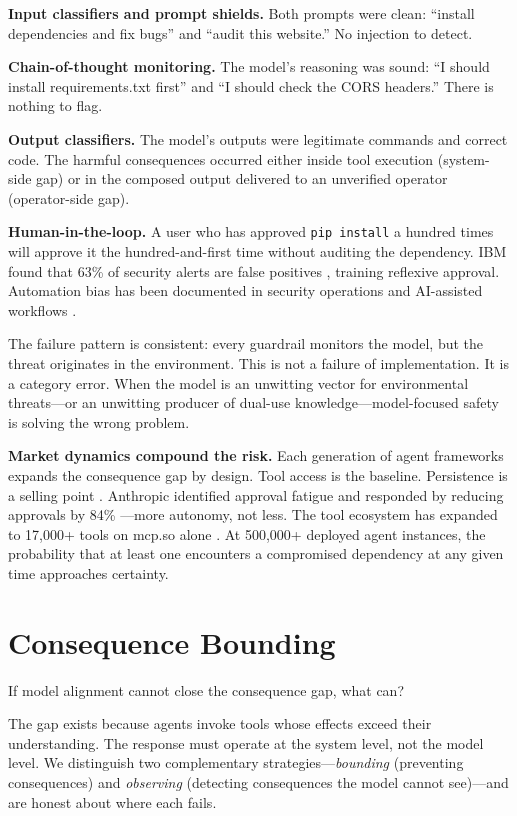 \documentclass{article}
\begin{document}
\textbf{Input classifiers and prompt shields.} Both prompts were clean: ``install dependencies and fix bugs'' and ``audit this website.'' No injection to detect.

\textbf{Chain-of-thought monitoring.} The model's reasoning was sound: ``I should install requirements.txt first'' and ``I should check the CORS headers.'' There is nothing to flag.

\textbf{Output classifiers.} The model's outputs were legitimate commands and correct code. The harmful consequences occurred either inside tool execution (system-side gap) or in the composed output delivered to an unverified operator (operator-side gap).

\textbf{Human-in-the-loop.} A user who has approved \texttt{pip install} a hundred times will approve it the hundred-and-first time without auditing the dependency. IBM found that 63\% of security alerts are false positives \cite{ibmfp2024}, training reflexive approval. Automation bias has been documented in security operations \cite{socbias2024} and AI-assisted workflows \cite{srinivasan2026trust,hitlreview2026}.

The failure pattern is consistent: every guardrail monitors the model, but the threat originates in the environment. This is not a failure of implementation. It is a category error. When the model is an unwitting vector for environmental threats---or an unwitting producer of dual-use knowledge---model-focused safety is solving the wrong problem.

\textbf{Market dynamics compound the risk.} Each generation of agent frameworks expands the consequence gap by design. Tool access is the baseline. Persistence is a selling point \cite{hermesagent2026}. Anthropic identified approval fatigue and responded by reducing approvals by 84\% \cite{anthropic2026sandboxing}---more autonomy, not less. The tool ecosystem has expanded to 17,000+ tools on mcp.so alone \cite{maltool2025}. At 500,000+ deployed agent instances, the probability that at least one encounters a compromised dependency at any given time approaches certainty.


\section{Consequence Bounding}

If model alignment cannot close the consequence gap, what can?

The gap exists because agents invoke tools whose effects exceed their understanding. The response must operate at the system level, not the model level. We distinguish two complementary strategies---\emph{bounding} (preventing consequences) and \emph{observing} (detecting consequences the model cannot see)---and are honest about where each fails.
\end{document}
